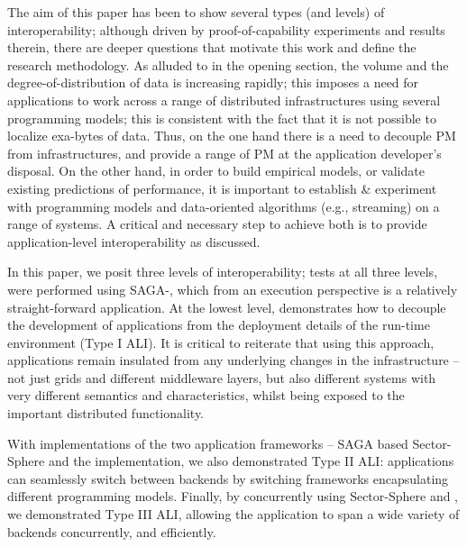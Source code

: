 \documentclass[3p,twocolumn]{elsarticle}
\begin{document}
The aim of this paper has been to show several types (and levels) of
interoperability; although driven by proof-of-capability experiments
and results therein, there are deeper questions that motivate this
work and define the research methodology.  As alluded to in the
opening section, the volume and the degree-of-distribution of data is
increasing rapidly; this imposes a need for applications to work
across a range of distributed infrastructures using several
programming models; this is consistent with the fact that it is not
possible to localize exa-bytes of data.  Thus, on the one hand there
is a need to decouple PM from infrastructures, and provide a range of
PM at the application developer's disposal. On the other hand, in
order to build empirical models, or validate existing predictions of
performance, it is important to establish \& experiment with
programming models and data-oriented algorithms (e.g., streaming) on a
range of systems. %
A critical and necessary step to achieve both is to provide
application-level interoperability as discussed.

In this paper, we posit three levels of interoperability; tests at all
three levels, were performed using SAGA-\mr, which from an execution
perspective is a relatively straight-forward application.  At the
lowest level, \sagamapreduce demonstrates how to decouple the
development of applications from the deployment details of the
run-time environment (Type I ALI).  It is critical to reiterate that
using this approach, applications remain insulated from any underlying
changes in the infrastructure -- not just grids and different
middleware layers, but also different systems with very different
semantics and characteristics, whilst being exposed to the important
distributed functionality.

With implementations of the two application frameworks -- SAGA based
Sector-Sphere and the \smr implementation, we also demonstrated Type
II ALI: applications can seamlessly switch between backends by
switching frameworks encapsulating different programming models.
Finally, by concurrently using Sector-Sphere \mr and \smr, we
demonstrated Type III ALI, allowing the application to span a wide
variety of backends concurrently, and efficiently.
\end{document}
